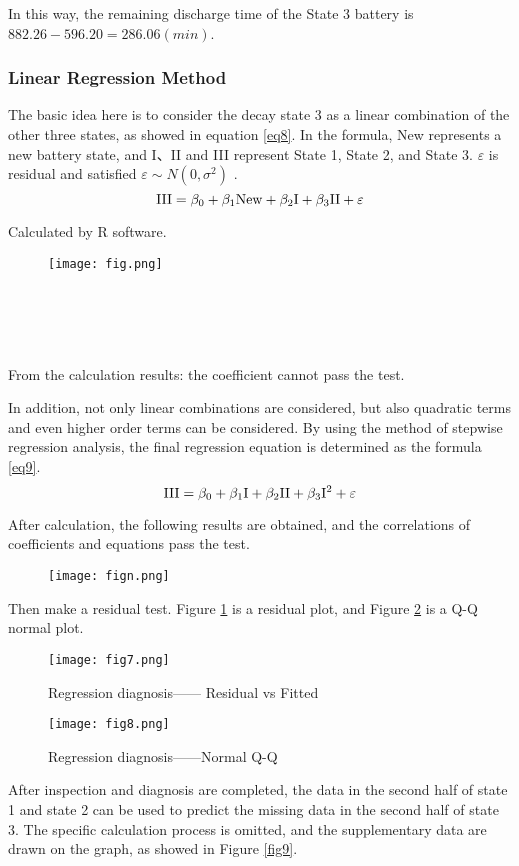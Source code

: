 \documentclass[conference]{IEEEtran}
\begin{document}
  In this way, the remaining discharge time of the State 3 battery is $882.26 -596.20 = 286.06 (min)$.
  \subsubsection{Linear Regression Method}The basic idea here is to consider the decay state 3 as a linear combination of the other three states, as showed in equation \eqref{eq8}. In the formula, New represents a new battery state, and I、II and III represent State 1, State 2, and State 3.  $\varepsilon $ is residual and satisfied $\varepsilon \sim N\left(0, \sigma^{2}\right)$ .
 \begin{equation}
 {\rm{III}} = {\beta _0} + {\beta _1}{\rm{New}} + {\beta _2}{\rm{I}} + {\beta _3}{\rm{II}} + \varepsilon 
 \label{eq8}
 \end{equation}

   Calculated by R software.
  \begin{figure}[htbp]
  	\centerline{\texttt{[image: fig.png]}}
  \end{figure}
~\\
~\\
~\\
~\\

  From the calculation results: the coefficient cannot pass the test.
   
  In addition, not only linear combinations are considered, but also quadratic terms and even higher order terms can be considered. By using the method of stepwise regression analysis, the final regression equation is determined as the formula \eqref{eq9}. 
 \begin{equation}
 {\rm{III}} = {\beta _0} + {\beta _1}{\rm{I}} + {\beta _2}{\rm{II}} + {\beta _3}{{\rm{I}}^{\rm{2}}} + \varepsilon \label{eq9}
 \end{equation}
 
  After calculation, the following results are obtained, and the correlations of coefficients and equations pass the test.
    \begin{figure}[htbp]
  	\centerline{\texttt{[image: fign.png]}}
  \end{figure}

Then make a residual test. Figure \ref{fig7} is a residual plot, and Figure \ref{fig8} is a Q-Q normal plot.

\begin{figure}[htbp]
	\centerline{\texttt{[image: fig7.png]}}
	\caption{Regression diagnosis—— Residual vs Fitted}
	\label{fig7}
\end{figure}
\begin{figure}[htbp]
	\centerline{\texttt{[image: fig8.png]}}
	\caption{Regression diagnosis——Normal Q-Q}
	\label{fig8}
\end{figure}
After inspection and diagnosis are completed, the data in the second half of state 1 and state 2 can be used to predict the missing data in the second half of state 3. The specific calculation process is omitted, and the supplementary data are drawn on the graph, as showed in Figure \ref{fig9}.
\end{document}
